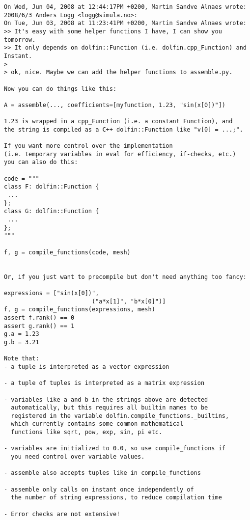 \footnotesize
\begin{verbatim}
On Wed, Jun 04, 2008 at 12:44:17PM +0200, Martin Sandve Alnaes wrote:
2008/6/3 Anders Logg <logg@simula.no>:
On Tue, Jun 03, 2008 at 11:23:41PM +0200, Martin Sandve Alnaes wrote:
>> It's easy with some helper functions I have, I can show you tomorrow.
>> It only depends on dolfin::Function (i.e. dolfin.cpp_Function) and Instant.
>
> ok, nice. Maybe we can add the helper functions to assemble.py.

Now you can do things like this:

A = assemble(..., coefficients=[myfunction, 1.23, "sin(x[0])"])

1.23 is wrapped in a cpp_Function (i.e. a constant Function), and
the string is compiled as a C++ dolfin::Function like "v[0] = ...;".

If you want more control over the implementation
(i.e. temporary variables in eval for efficiency, if-checks, etc.)
you can also do this:

code = """
class F: dolfin::Function {
 ...
};
class G: dolfin::Function {
 ...
};
"""

f, g = compile_functions(code, mesh)


Or, if you just want to precompile but don't need anything too fancy:

expressions = ["sin(x[0])",
                         ("a*x[1]", "b*x[0]")]
f, g = compile_functions(expressions, mesh)
assert f.rank() == 0
assert g.rank() == 1
g.a = 1.23
g.b = 3.21

Note that:
- a tuple is interpreted as a vector expression

- a tuple of tuples is interpreted as a matrix expression

- variables like a and b in the strings above are detected
  automatically, but this requires all builtin names to be
  registered in the variable dolfin.compile_functions._builtins,
  which currently contains some common mathematical
  functions like sqrt, pow, exp, sin, pi etc.

- variables are initialized to 0.0, so use compile_functions if
  you need control over variable values.

- assemble also accepts tuples like in compile_functions

- assemble only calls on instant once independently of
  the number of string expressions, to reduce compilation time

- Error checks are not extensive!
\end{verbatim}
\normalsize
